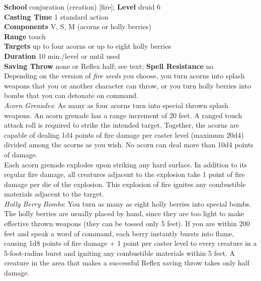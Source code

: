 \textbf{School} conjuration (creation) [fire]; \textbf{Level} druid 6\\
\textbf{Casting Time} 1 standard action\\
\textbf{Components} V, S, M (acorns or holly berries)\\
\textbf{Range} touch\\
\textbf{Targets} up to four acorns or up to eight holly berries\\
\textbf{Duration} 10 min./level or until used\\
\textbf{Saving Throw} none or Reflex half; see text; \textbf{Spell Resistance} no\\
Depending on the version of \textit{fire seeds }you choose, you turn acorns into splash weapons that you or another character can throw, or you turn holly berries into bombs that you can detonate on command.\\
\textit{Acorn Grenades}: As many as four acorns turn into special thrown splash weapons. An acorn grenade has a range increment of 20 feet. A ranged touch attack roll is required to strike the intended target. Together, the acorns are capable of dealing 1d4 points of fire damage per caster level (maximum 20d4) divided among the acorns as you wish. No acorn can deal more than 10d4 points of damage.\\
Each acorn grenade explodes upon striking any hard surface. In addition to its regular fire damage, all creatures adjacent to the explosion take 1 point of fire damage per die of the explosion. This explosion of fire ignites any combustible materials adjacent to the target.\\
\textit{Holly Berry Bombs}: You turn as many as eight holly berries into special bombs. The holly berries are usually placed by hand, since they are too light to make effective thrown weapons (they can be tossed only 5 feet). If you are within 200 feet and speak a word of command, each berry instantly bursts into flame, causing 1d8 points of fire damage + 1 point per caster level to every creature in a 5-foot-radius burst and igniting any combustible materials within 5 feet. A creature in the area that makes a successful Reflex saving throw takes only half damage.\\
